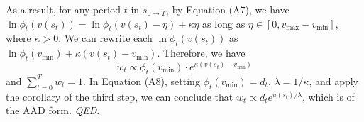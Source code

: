 \documentclass[
  12pt,
]{article}
\begin{document}
As a result, for any period \(t\) in \(s_{0\rightarrow T}\), by Equation
(A7), we have \(\ln \phi_t(v(s_t))=\ln\phi_t(v(s_t)-\eta)+\kappa\eta\)
as long as \(\eta\in[0,v_{\max}-v_{\min}]\), where \(\kappa>0\). We can
rewrite each \(\ln \phi_t(v(s_t))\) as
\(\ln \phi_t(v_{\min})+\kappa(v(s_t)-v_{\min})\). Therefore, we
have\[\tag{A8}
w_t \propto \phi_t(v_{\min})\cdot e^{\kappa(v(s_t)-v_{\min})}
\]and \(\sum_{t=0}^T w_t=1\). In Equation (A8), setting
\(\phi_t(v_{\min})=d_t\), \(\lambda = 1/\kappa\), and apply the
corollary of the third step, we can conclude that
\(w_t\propto d_t e^{u(s_t)/\lambda}\), which is of the AAD form.
\emph{QED}.
\end{document}
